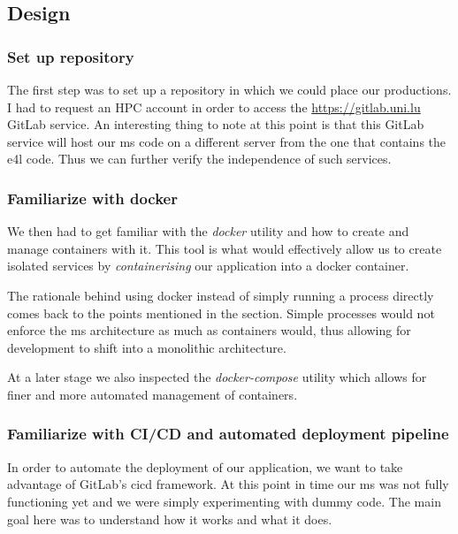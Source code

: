 \subsection{Design}

\subsubsection{Set up repository}

The first step was to set up a repository in which we could place our
productions. I had to request an HPC account in order to access the
\url{https://gitlab.uni.lu} GitLab service. An interesting thing to
note at this point is that this GitLab service will host our
\gls{ms} code on a different server from the one that contains the
\gls{e4l} code. Thus we can further verify the independence of such
services.

\subsubsection{Familiarize with docker}

We then had to get familiar with the \textit{docker} utility and how
to create and manage containers with it. This tool is what would
effectively allow us to create isolated services by \emph{containerising} our
application into a docker container.

The rationale behind using docker instead of simply running a process
directly comes back to the points mentioned in the
 section. Simple processes would not
enforce the \gls{ms} architecture as much as containers would, thus
allowing for development to shift into a monolithic architecture.

At a later stage we also inspected the \textit{docker-compose}
utility which allows for finer and more automated management of
containers.

\subsubsection{Familiarize with CI/CD and automated deployment pipeline}

In order to automate the deployment of our application, we want to
take advantage of GitLab's \gls{cicd} framework. At this point in time
our \gls{ms} was not fully functioning yet and we were simply
experimenting with dummy code. The main goal here was to understand
how it works and what it does.


